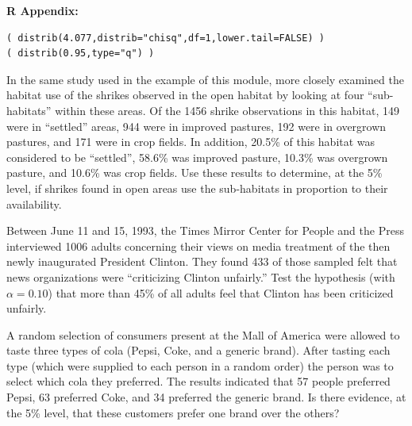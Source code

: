 \documentclass[10pt,openany]{book}\usepackage[]{graphicx}\usepackage[]{color}
\makeatletter
\newenvironment{kframe}{%
 \def\at@end@of@kframe{}%
 \ifinner\ifhmode%
  \def\at@end@of@kframe{\end{minipage}}%
  \begin{minipage}{\columnwidth}%
 \fi\fi%
 \def\FrameCommand##1{\hskip\@totalleftmargin \hskip-\fboxsep
 \colorbox{shadecolor}{##1}\hskip-\fboxsep
     \hskip-\linewidth \hskip-\@totalleftmargin \hskip\columnwidth}%
 \MakeFramed {\advance\hsize-\width
   \@totalleftmargin\z@ \linewidth\hsize
   \@setminipage}}%
 {\par\unskip\endMakeFramed%
 \at@end@of@kframe}
\newenvironment{knitrout}{}{} %
\makeatother
\begin{document}
\begin{minipage}{\textwidth}
\textbf{R Appendix:}
\begin{knitrout}
\color{fgcolor}\begin{kframe}
\begin{verbatim}
( distrib(4.077,distrib="chisq",df=1,lower.tail=FALSE) )
( distrib(0.95,type="q") )
\end{verbatim}
\end{kframe}
\end{knitrout}
\end{minipage}


\newpage
\begin{exsection}
  \item \label{revex:ChiGOFShrike} In the same study used in the example of this module, \cite{BohallWood1987} more closely examined the habitat use of the shrikes observed in the open habitat by looking at four ``sub-habitats'' within these areas.  Of the 1456 shrike observations in this habitat, 149 were in ``settled'' areas, 944 were in improved pastures, 192 were in overgrown pastures, and 171 were in crop fields.  In addition, 20.5\% of this habitat was considered to be ``settled'', 58.6\% was improved pasture, 10.3\% was overgrown pasture, and 10.6\% was crop fields.    Use these results to determine, at the 5\% level, if shrikes found in open areas use the sub-habitats in proportion to their availability. 

  \item \label{revex:ChiGOFClinton} Between June 11 and 15, 1993, the Times Mirror Center for People and the Press interviewed 1006 adults concerning their views on media treatment of the then newly inaugurated President Clinton.  They found 433 of those sampled felt that news organizations were ``criticizing Clinton unfairly.''  Test the hypothesis (with $\alpha=0.10$) that more than 45\% of all adults feel that Clinton has been criticized unfairly. 

  \item \label{revex:ChiGOFPref2} A random selection of consumers present at the Mall of America were allowed to taste three types of cola (Pepsi, Coke, and a generic brand).  After tasting each type (which were supplied to each person in a random order) the person was to select which cola they preferred.  The results indicated that 57 people preferred Pepsi, 63 preferred Coke, and 34 preferred the generic brand.  Is there evidence, at the 5\% level, that these customers prefer one brand over the others? 


\end{exsection}
\end{document}
